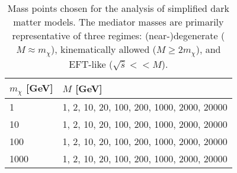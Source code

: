 \begin{flushleft}
\begin{table}[!htbp]
\centering
\begin{tabular}{l|l}
\hline
\hline
 \rule{0pt}{2.2ex}$m_{\chi}$ [GeV] & $M$ [GeV]\\
\hline
 \rule{0pt}{2.2ex} 1 & 1, 2, 10, 20, 100, 200, 1000, 2000, 20000 \\
 10 & 1, 2, 10, 20, 100, 200, 1000, 2000, 20000 \\
 100 & 1, 2, 10, 20, 100, 200, 1000, 2000, 20000 \\
 1000 & 1, 2, 10, 20, 100, 200, 1000, 2000, 20000 \\
 \hline
 \hline
\end{tabular}
\caption{Mass points chosen for the analysis of simplified dark matter models. The mediator masses are primarily representative of three regimes: (near-)degenerate ($M\approx m_{\chi}$), kinematically allowed ($M \geq 2m_{\chi}$), and EFT-like ($\sqrt{\hat{s}} << M$).}
\label{Mass_coup_points}
\end{table}

\end{flushleft}

